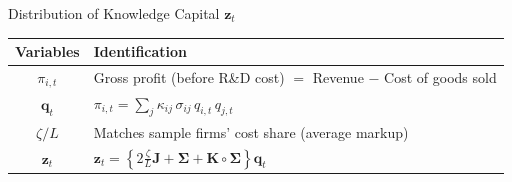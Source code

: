 \documentclass[
  10pt,               %
  aspectratio=169,    %
]{beamer}
\theoremstyle{plain}
\begin{document}
%
\begin{frame}{Distribution of Knowledge Capital $\bm{z}_t$}
  \begin{table}[htbp]
    \centering
    \begin{tabular}{cl}
      \toprule
     Variables & Identification \\
      \midrule
      $\pi_{i,t}$ 
        & Gross profit (before R\&D cost) 
          $=$ Revenue $-$ Cost of goods sold \\[6pt]
      $\bm{q}_t$
        &
          $\pi_{i,t}=\displaystyle\sum_{j}\kappa_{ij}\,\sigma_{ij}\,q_{i,t}\,q_{j,t}$ \\[6pt]
      $\zeta/L$
        & Matches sample firms’ cost share (average markup) \\[6pt]
      $\bm{z}_t$
        &
          $\displaystyle \bm{z}_{t}
           =\left\{2\frac{\zeta}{L}\bm{J}+\bm{\Sigma}+\bm{K}\circ\bm{\Sigma}\right\}\bm{q}_{t}$ \\
      \bottomrule
    \end{tabular}
  \end{table}
\end{frame}
%
\end{document}
